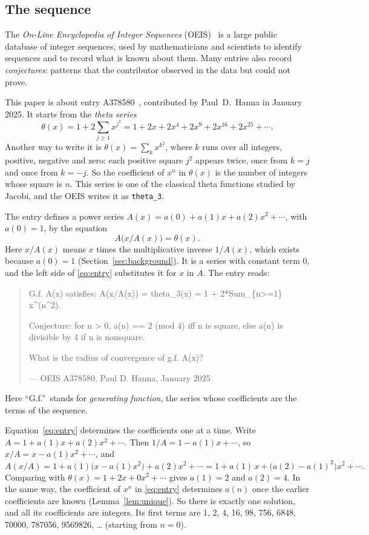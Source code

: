 \documentclass[11pt,a4paper]{article}
\theoremstyle{definition}
\theoremstyle{remark}
\begin{document}
\subsection{The sequence}\label{sec:sequence}
The \emph{On-Line Encyclopedia of Integer Sequences} (OEIS)~\cite{oeisdb} is a large public database of integer
sequences, used by mathematicians and scientists to identify sequences and to record what is known about them. Many
entries also record \emph{conjectures}: patterns that the contributor observed in the data but could not prove.

This paper is about entry A378580~\cite{oeis}, contributed by Paul~D.~Hanna in January 2025. It starts from the
\emph{theta series}
\[
\theta(x)=1+2\sum_{j\ge1}x^{j^2}=1+2x+2x^4+2x^9+2x^{16}+2x^{25}+\cdots .
\]
Another way to write it is $\theta(x)=\sum_{k}x^{k^2}$, where $k$ runs over all integers, positive, negative and zero:
each positive square $j^2$ appears twice, once from $k=j$ and once from $k=-j$. So the coefficient of $x^n$ in
$\theta(x)$ is the number of integers whose square is $n$. This series is one of the classical theta functions studied
by Jacobi, and the OEIS writes it as \texttt{theta\_3}.

The entry defines a power series $A(x)=a(0)+a(1)x+a(2)x^2+\cdots$, with $a(0)=1$, by the equation
\begin{equation}\label{eq:entry}
A\bigl(x/A(x)\bigr)=\theta(x) .
\end{equation}
Here $x/A(x)$ means $x$ times the multiplicative inverse $1/A(x)$, which exists because $a(0)=1$
(Section~\ref{sec:background}). It is a series with constant term $0$, and the left side of \eqref{eq:entry} substitutes
it for $x$ in $A$. The entry reads:
\begin{quote}\small\ttfamily\raggedright G.f. A(x) satisfies: A(x/A(x)) = theta\_3(x) = 1 + 2*Sum\_\{n>=1\} x\^{}(n\^{}2).\par\smallskip Conjecture: for n > 0, a(n) == 2 (mod 4) iff n is square, else a(n) is divisible by 4 if n is nonsquare.\par\smallskip What is the radius of convergence of g.f. A(x)?\par\smallskip\hfill\textrm{--- OEIS A378580, Paul D. Hanna, January 2025}\end{quote}

Here ``G.f.''\ stands for \emph{generating function}, the series whose coefficients are the terms of the sequence.

Equation~\eqref{eq:entry} determines the coefficients one at a time. Write $A=1+a(1)x+a(2)x^2+\cdots$. Then
$1/A=1-a(1)x+\cdots$, so $x/A=x-a(1)x^2+\cdots$, and
\[
A(x/A)=1+a(1)\bigl(x-a(1)x^2\bigr)+a(2)x^2+\cdots=1+a(1)\,x+\bigl(a(2)-a(1)^2\bigr)x^2+\cdots .
\]
Comparing with $\theta(x)=1+2x+0x^2+\cdots$ gives $a(1)=2$ and $a(2)=4$. In the same way, the coefficient
of $x^n$ in \eqref{eq:entry} determines $a(n)$ once the earlier coefficients are known (Lemma~\ref{lem:unique}). So
there is exactly one solution, and all its coefficients are integers. Its first terms are
1, 2, 4, 16, 98, 756, 6848, 70000, 787056, 9569826, \dots{} (starting from $n=0$).
\end{document}
